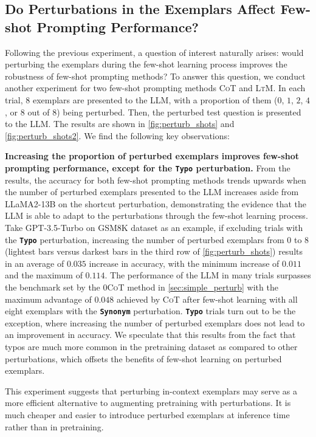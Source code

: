 \documentclass[11pt]{article}
\begin{document}
\subsection{Do Perturbations in the Exemplars Affect Few-shot Prompting Performance?}\label{sec:perturbprompt}

Following the previous experiment, a question of interest naturally arises: would perturbing the exemplars during the few-shot learning process improves the robustness of few-shot prompting methods? To answer this question, we conduct another experiment for two few-shot prompting methods \textsc{CoT} and \textsc{LtM}. In each trial, $8$ exemplars are presented to the LLM, with a proportion of them ($0$, $1$, $2$, $4$, or $8$ out of $8$) being perturbed. Then, the perturbed test question is presented to the LLM. The results are shown in \autoref{fig:perturb_shots} and \autoref{fig:perturb_shots2}. We find the following key observations:

\noindent\textbf{Increasing the proportion of perturbed exemplars improves few-shot prompting performance, except for the \texttt{Typo} perturbation.} From the results, the accuracy for both few-shot prompting methods trends upwards when the number of perturbed exemplars presented to the LLM increases aside from LLaMA2-13B on the shortcut perturbation, demonstrating the evidence that the LLM is able to adapt to the perturbations through the few-shot learning process. Take GPT-3.5-Turbo on GSM8K dataset as an example, if excluding trials with the \textbf{\texttt{Typo}} perturbation, increasing the number of perturbed exemplars from $0$ to $8$ (lightest bars versus darkest bars in the third row of \autoref{fig:perturb_shots}) results in an average of $0.035$ increase in accuracy, with the minimum increase of $0.011$ and the maximum of $0.114$. The performance of the LLM in many trials surpasses the benchmark set by the \textsc{0CoT} method in \autoref{sec:simple_perturb} with the maximum advantage of $0.048$ achieved by \textsc{CoT} after few-shot learning with all eight exemplars with the \textbf{\texttt{Synonym}} perturbation. \textbf{\texttt{Typo}} trials turn out to be the exception, where increasing the number of perturbed exemplars does not lead to an improvement in accuracy. We speculate that this results from the fact that typos are much more common in the pretraining dataset as compared to other perturbations, which offsets the benefits of few-shot learning on perturbed exemplars.

This experiment suggests that perturbing in-context exemplars may serve as a more efficient alternative to augmenting pretraining with perturbations. It is much cheaper and easier to introduce perturbed exemplars at inference time rather than in pretraining. %
\end{document}
